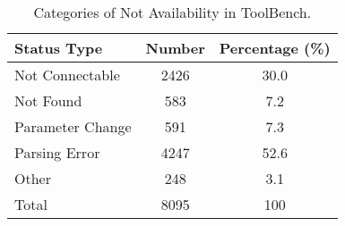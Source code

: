 \begin{table}[h!]
    \centering
    \small
    \begin{tabular}{lcc}
     \toprule
    \textbf{Status Type} & \textbf{Number} & \textbf{Percentage} (\%) \\
    \midrule
    Not Connectable & 2426 & 30.0 \\
    Not Found & 583 & 7.2 \\
    Parameter Change & 591 & 7.3 \\
    Parsing Error & 4247 & 52.6 \\
    Other & 248 & 3.1 \\
    \midrule
    Total & 8095 & 100 \\
     \bottomrule
    \end{tabular}
    \caption{Categories of Not Availability in ToolBench.}
    \label{tab:api_not_available}
\end{table}



